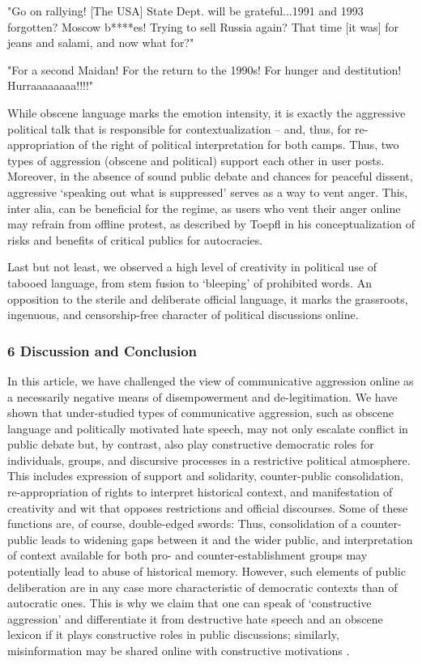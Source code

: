\hspace{\parindent}"Go on rallying! [The USA] State Dept. will be grateful...1991 and 1993 forgotten? Moscow b****es! Trying to sell Russia again? That time [it was] for jeans and salami, and now what for?"

\hspace{\parindent}"For a second Maidan! For the return to the 1990s! For hunger and destitution! Hurraaaaaaaa!!!!"

While obscene language marks the emotion intensity, it is exactly the aggressive political talk that is responsible for contextualization -- and, thus, for re-appropriation of the right of political interpretation for both camps. Thus, two types of aggression (obscene and political) support each other in user posts. Moreover, in the absence of sound public debate and chances for peaceful dissent, aggressive ‘speaking out what is suppressed’ serves as a way to vent anger. This, inter alia, can be beneficial for the regime, as users who vent their anger online may refrain from offline protest, as described by Toepfl \cite{Toepfl} in his conceptualization of risks and benefits of critical publics for autocracies.

Last but not least, we observed a high level of creativity in political use of tabooed language, from stem fusion to ‘bleeping’ of prohibited words. An opposition to the sterile and deliberate official language, it marks the grassroots, ingenuous, and censorship-free character of political discussions online.

\subsubsection{6 Discussion and Conclusion}

In this article, we have challenged the view of communicative aggression online as a necessarily negative means of disempowerment and de-legitimation. We have shown that under-studied types of communicative aggression, such as obscene language and politically motivated hate speech, may not only escalate conflict in public debate but, by contrast, also play constructive democratic roles for individuals, groups, and discursive processes in a restrictive political atmosphere. This includes expression of support and solidarity, counter-public consolidation, re-appropriation of rights to interpret historical context, and manifestation of creativity and wit that opposes restrictions and official discourses. Some of these functions are, of course, double-edged swords: Thus, consolidation of a counter-public leads to widening gaps between it and the wider public, and interpretation of context available for both pro- and counter-establishment groups may potentially lead to abuse of historical memory. However, such elements of public deliberation are in any case more characteristic of democratic contexts than of autocratic ones. This is why we claim that one can speak of ‘constructive aggression’ and differentiate it from destructive hate speech and an obscene lexicon if it plays constructive roles in public discussions; similarly, misinformation may be shared online with constructive motivations \cite{MetzgerFlanaginMena}.

